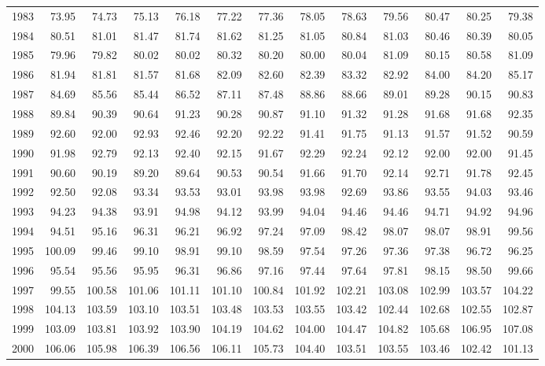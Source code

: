 \begin{longtable}{rrrrrrrrrrrrr}
  1983 & 73.95 & 74.73 & 75.13 & 76.18 & 77.22 & 77.36 & 78.05 & 78.63 & 79.56 & 80.47 & 80.25 & 79.38 \\ 
  1984 & 80.51 & 81.01 & 81.47 & 81.74 & 81.62 & 81.25 & 81.05 & 80.84 & 81.03 & 80.46 & 80.39 & 80.05 \\ 
  1985 & 79.96 & 79.82 & 80.02 & 80.02 & 80.32 & 80.20 & 80.00 & 80.04 & 81.09 & 80.15 & 80.58 & 81.09 \\ 
  1986 & 81.94 & 81.81 & 81.57 & 81.68 & 82.09 & 82.60 & 82.39 & 83.32 & 82.92 & 84.00 & 84.20 & 85.17 \\ 
  1987 & 84.69 & 85.56 & 85.44 & 86.52 & 87.11 & 87.48 & 88.86 & 88.66 & 89.01 & 89.28 & 90.15 & 90.83 \\ 
  1988 & 89.84 & 90.39 & 90.64 & 91.23 & 90.28 & 90.87 & 91.10 & 91.32 & 91.28 & 91.68 & 91.68 & 92.35 \\ 
  1989 & 92.60 & 92.00 & 92.93 & 92.46 & 92.20 & 92.22 & 91.41 & 91.75 & 91.13 & 91.57 & 91.52 & 90.59 \\ 
  1990 & 91.98 & 92.79 & 92.13 & 92.40 & 92.15 & 91.67 & 92.29 & 92.24 & 92.12 & 92.00 & 92.00 & 91.45 \\ 
  1991 & 90.60 & 90.19 & 89.20 & 89.64 & 90.53 & 90.54 & 91.66 & 91.70 & 92.14 & 92.71 & 91.78 & 92.45 \\ 
  1992 & 92.50 & 92.08 & 93.34 & 93.53 & 93.01 & 93.98 & 93.98 & 92.69 & 93.86 & 93.55 & 94.03 & 93.46 \\ 
  1993 & 94.23 & 94.38 & 93.91 & 94.98 & 94.12 & 93.99 & 94.04 & 94.46 & 94.46 & 94.71 & 94.92 & 94.96 \\ 
  1994 & 94.51 & 95.16 & 96.31 & 96.21 & 96.92 & 97.24 & 97.09 & 98.42 & 98.07 & 98.07 & 98.91 & 99.56 \\ 
  1995 & 100.09 & 99.46 & 99.10 & 98.91 & 99.10 & 98.59 & 97.54 & 97.26 & 97.36 & 97.38 & 96.72 & 96.25 \\ 
  1996 & 95.54 & 95.56 & 95.95 & 96.31 & 96.86 & 97.16 & 97.44 & 97.64 & 97.81 & 98.15 & 98.50 & 99.66 \\ 
  1997 & 99.55 & 100.58 & 101.06 & 101.11 & 101.10 & 100.84 & 101.92 & 102.21 & 103.08 & 102.99 & 103.57 & 104.22 \\ 
  1998 & 104.13 & 103.59 & 103.10 & 103.51 & 103.48 & 103.53 & 103.55 & 103.42 & 102.44 & 102.68 & 102.55 & 102.87 \\ 
  1999 & 103.09 & 103.81 & 103.92 & 103.90 & 104.19 & 104.62 & 104.00 & 104.47 & 104.82 & 105.68 & 106.95 & 107.08 \\ 
  2000 & 106.06 & 105.98 & 106.39 & 106.56 & 106.11 & 105.73 & 104.40 & 103.51 & 103.55 & 103.46 & 102.42 & 101.13 \\ 

\end{longtable}
